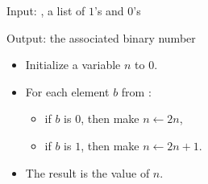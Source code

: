 \documentclass[11pt,class=report,crop=false]{standalone}
\begin{document}
\begin{activite}
\begin{enumerate}
  \begin{algorithme}
  Input: , a list of $1$'s and $0$'s 
  
  Output: the associated binary number 

  \begin{itemize}
    \item Initialize a variable $n$ to $0$.

    
    \item For each element $b$ from :
    
     \begin{itemize} 
       \item if $b$ is $0$, then make $n \leftarrow 2n$,
       \item if $b$ is $1$, then make $n \leftarrow 2n+1$.
     \end{itemize}    
         
    \item The result is the value of $n$.
  \end{itemize} 
             
 \end{algorithme}
 
\end{enumerate}

\end{activite}
  
  
\end{document}
